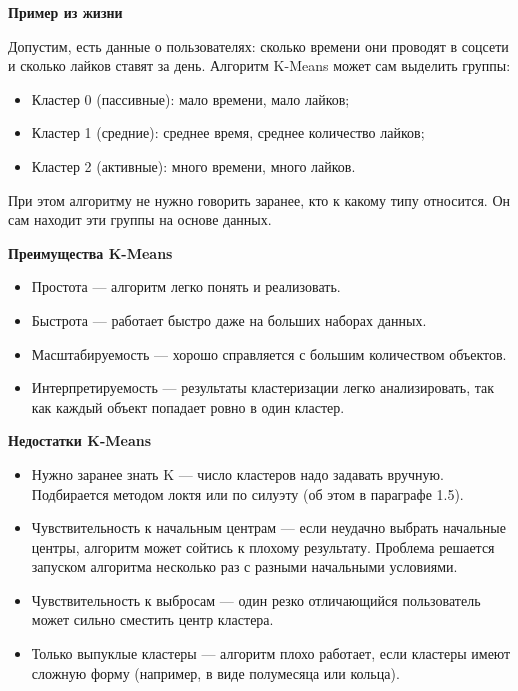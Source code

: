 \documentclass[14pt, a4paper]{extarticle}
\begin{document}
\textbf{Пример из жизни}
\smallskip

Допустим, есть данные о пользователях: сколько времени они проводят в соцсети и сколько лайков ставят за день. Алгоритм K-Means может сам выделить группы:

\begin{itemize}
    \item Кластер 0 (пассивные): мало времени, мало лайков;
    \item Кластер 1 (средние): среднее время, среднее количество лайков;
    \item Кластер 2 (активные): много времени, много лайков.
\end{itemize}

При этом алгоритму не нужно говорить заранее, кто к какому типу относится. Он сам находит эти группы на основе данных.

\textbf{Преимущества K-Means}
\smallskip

\begin{itemize}
    \item Простота — алгоритм легко понять и реализовать.
    \item Быстрота — работает быстро даже на больших наборах данных.
    \item Масштабируемость — хорошо справляется с большим количеством объектов.
    \item Интерпретируемость — результаты кластеризации легко анализировать, так как каждый объект попадает ровно в один кластер.
\end{itemize}

\textbf{Недостатки K-Means}
\smallskip

\begin{itemize}
    \item Нужно заранее знать K — число кластеров надо задавать вручную. Подбирается методом локтя или по силуэту (об этом в параграфе 1.5).
    \item Чувствительность к начальным центрам — если неудачно выбрать начальные центры, алгоритм может сойтись к плохому результату. Проблема решается запуском алгоритма несколько раз с разными начальными условиями.
    \item Чувствительность к выбросам — один резко отличающийся пользователь может сильно сместить центр кластера.
    \item Только выпуклые кластеры — алгоритм плохо работает, если кластеры имеют сложную форму (например, в виде полумесяца или кольца).
\end{itemize}
\end{document}
